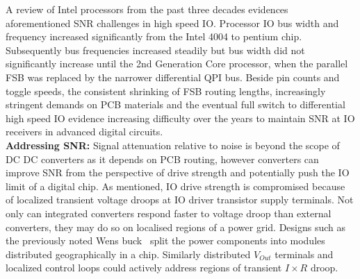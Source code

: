\documentclass[letterpaper,twocolumn,10pt]{article}
\begin{document}
A review of Intel processors from the past three decades evidences aforementioned SNR challenges in high speed IO.
Processor IO bus width and frequency increased significantly from the Intel 4004 to pentium chip. Subsequently bus frequencies increased steadily but bus width did not significantly increase until the 2nd Generation Core processor, when the parallel FSB was replaced by the narrower differential QPI bus. Beside pin counts and toggle speeds, the consistent shrinking of FSB routing lengths, increasingly stringent demands on PCB materials and the eventual full switch to differential high speed IO evidence increasing difficulty over the years to maintain SNR at IO receivers in advanced digital circuits.\\ %
\textbf{Addressing SNR: }
Signal attenuation relative to noise is beyond the scope of DC DC converters as it depends on PCB routing, however converters can improve SNR from the perspective of drive strength and potentially push the IO limit of a digital chip.
\indent As mentioned, IO drive strength is compromised because of localized transient voltage droops at IO driver transistor supply terminals. %
Not only can integrated converters respond faster to voltage droop than external converters, they may do so on localised regions of a power grid. Designs such as the previously noted Wens buck~\cite{Wens2011} split the power components into modules distributed geographically in a chip. Similarly distributed $V_{Out}$ terminals and localized control loops could actively address regions of transient $I \times R$ droop.\\ 


 
  
\end{document}
